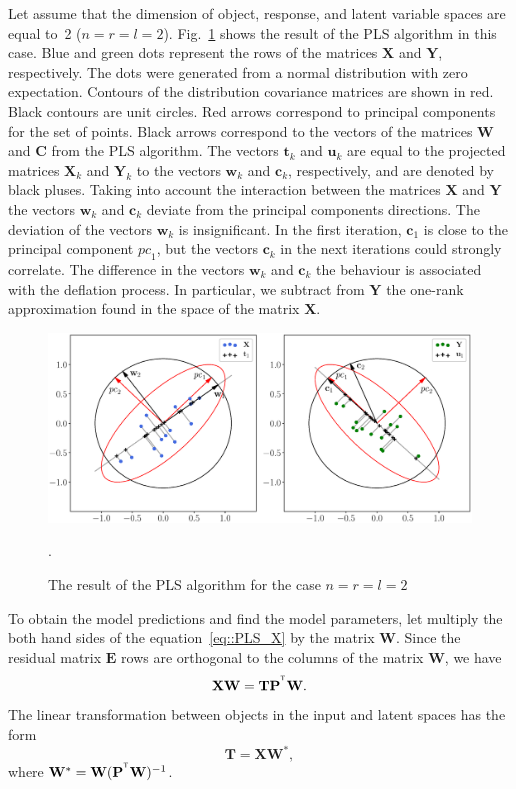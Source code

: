 \documentclass[preprint,12pt]{elsarticle}
\newcommand{\bw}{\mathbf{w}}
\newcommand{\bY}{\mathbf{Y}}
\newcommand{\bX}{\mathbf{X}}
\newcommand{\bu}{\mathbf{u}}
\newcommand{\bt}{\mathbf{t}}
\newcommand{\bc}{\mathbf{c}}
\newcommand{\bP}{\mathbf{P}}
\newcommand{\bT}{\mathbf{T}}
\newcommand{\bC}{\mathbf{C}}
\newcommand{\bE}{\mathbf{E}}
\newcommand{\bW}{\mathbf{W}}
\newcommand{\T}{^{\text{\tiny\sffamily\upshape\mdseries T}}}
\begin{document}
Let assume that the dimension of object, response, and latent variable spaces are equal to~2 ($n = r = l = 2$).
Fig.~\ref{fig::PLSFigure} shows the result of the PLS algorithm in this case.
Blue and green dots represent the rows of the matrices $\bX$ and $\bY$, respectively. 
The dots were generated from a normal distribution with zero expectation. 
Contours of the distribution covariance matrices are shown in red.
Black contours are unit circles. 
Red arrows correspond to principal components for the set of points. 
Black arrows correspond to the vectors of the matrices $\bW$ and $\bC$ from the PLS algorithm. 
The vectors $\bt_k$ and $\bu_k$ are equal to the projected matrices $\bX_k$ and $\bY_k$ to the vectors $\bw_k$ and $\bc_k$, respectively, and are denoted by black pluses. 
Taking into account the interaction between the matrices $\bX$ and $\bY$ the vectors $\bw_k$ and $\bc_k$ deviate from the principal components directions. 
The deviation of the vectors $\bw_k$ is insignificant. 
In the first iteration, $\bc_1$ is close to the principal component $\textit{pc}_1$, but the vectors $\bc_k$ in the next iterations could strongly correlate. 
The difference in the vectors $\bw_k$ and $\bc_k$ the behaviour is associated with the deflation process. In particular, we subtract from $\bY$ the one-rank approximation found in the space of the matrix $\bX$.
\begin{figure}[h]
	\centering
	\includegraphics[width=\linewidth]{figs/PLSFigure.eps}
	\caption{The result of the PLS algorithm for the case $n = r = l = 2$}.
	\label{fig::PLSFigure}
\end{figure}

To obtain the model predictions and find the model parameters, let multiply the both hand sides of the equation~\eqref{eq::PLS_X} by the matrix $\bW$. 
Since the residual matrix  $\bE$ rows are orthogonal to the columns of the matrix $\bW$, we have
\[
\bX \bW = \bT \bP^{\T} \bW.
\]
The linear transformation between objects in the input and latent spaces has the form
\begin{equation}
\bT = \bX \bW^*,
\label{eq::W*}
\end{equation}
where $\bW^* = \bW (\bP^{\T} \bW)^{-1}$.
\end{document}
